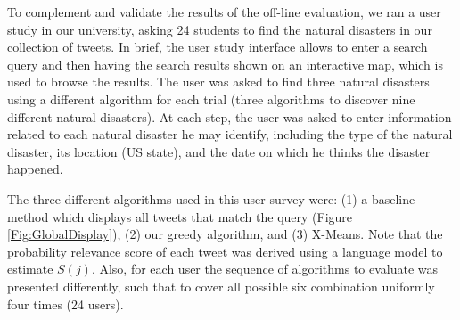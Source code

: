 To complement and validate the results of the off-line evaluation, we ran a user study in our university, asking 24 students to find the natural disasters in our collection of tweets. In brief, the user study interface allows to enter a search query and then having the search results shown on an interactive map, which is used to browse the results. %
The user was asked to find three natural disasters using a different algorithm for each trial (three algorithms to discover nine different natural disasters). At each step, the user was asked to enter information related to each natural disaster he may identify, including the type of the natural disaster, its location (US state), and the date on which he thinks the disaster happened. %


The three different algorithms used in this user survey were: (1) a baseline method which displays all tweets that match the query (Figure \ref{Fig:GlobalDisplay}), (2) our greedy algorithm, and (3) X-Means. Note that the probability relevance score of each tweet was derived using a language model to estimate $S(j)$.
Also, for each user the sequence of algorithms to evaluate was presented differently, such that to cover all possible six combination uniformly four times (24 users). %



